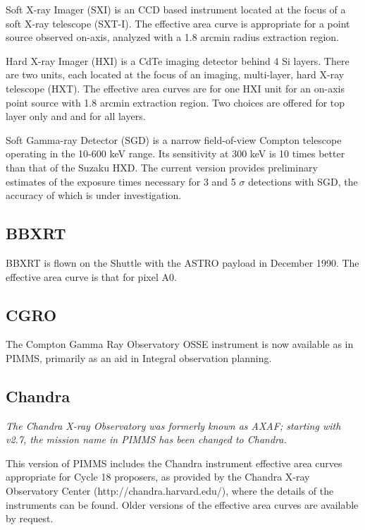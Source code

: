 Soft X-ray Imager (SXI) is an CCD based instrument located at the focus of
a soft X-ray telescope (SXT-I).  The effective area curve is appropriate for
a point source observed on-axis, analyzed with a 1.8 arcmin radius extraction
region.

Hard X-ray Imager (HXI) is a CdTe imaging detector behind 4 Si layers.
There are two units, each located at the focus of an imaging, multi-layer,
hard X-ray telescope (HXT).  The effective area curves are for one HXI
unit for an on-axis point source with 1.8 arcmin extraction region.
Two choices are offered for top layer only and and for all layers.

Soft Gamma-ray Detector (SGD) is a narrow field-of-view Compton telescope
operating in the 10-600 keV range.  Its sensitivity at 300 keV is 10 times
better than that of the Suzaku HXD.  The current version provides preliminary
estimates of the exposure times necessary for 3 and 5 $\sigma$ detections with
SGD, the accuracy of which is under investigation.

\subsection{BBXRT}

BBXRT is flown on the Shuttle with the ASTRO payload in December 1990.   The
effective area curve  is that for pixel A0.

\subsection{CGRO}

The Compton Gamma Ray Observatory OSSE instrument is now available as
in PIMMS, primarily as an aid in Integral observation planning.

\subsection{Chandra}

{\it The Chandra X-ray Observatory was formerly known as AXAF; starting
with v2.7, the mission name in PIMMS has been changed to Chandra.}

This version of PIMMS includes the Chandra instrument effective area curves
appropriate for Cycle 18 proposers, as provided by the Chandra X-ray
Observatory Center (http://chandra.harvard.edu/), where the details of the
instruments can be found.  Older versions of the effective area curves are
available by request.

